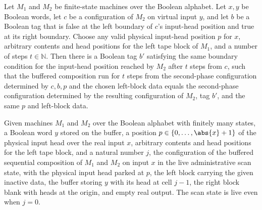 \begin{lemma}
\label{Turing.FinTM.bufferedSecondCfg_run}
\leanok
{}
Let $M_1$ and $M_2$ be finite-state machines over the Boolean alphabet. Let $x,y$ be
Boolean words, let $c$ be a configuration of $M_2$ on virtual input $y$, and let $b$ be
a Boolean tag that is false at the left boundary of $c$'s input-head position and true
at its right boundary. Choose any valid physical input-head position $p$ for $x$,
arbitrary contents and head positions for the left tape block of $M_1$, and a number of
steps $t\in\mathbb N$. Then there is a Boolean tag $b'$ satisfying the same boundary
condition for the input-head position reached by $M_2$ after $t$ steps from $c$, such
that the buffered composition run for $t$ steps from the second-phase configuration
determined by $c,b,p$ and the chosen left-block data equals the second-phase
configuration determined by the resulting configuration of $M_2$, tag $b'$, and the same
$p$ and left-block data.
\end{lemma}

\begin{definition}
\label{Turing.FinTM.bufferedScanCfg}
\leanok
{}
Given machines $M_1$ and $M_2$ over the Boolean alphabet with finitely many
states, a Boolean word $y$ stored on the buffer, a position
$p \in \{0,\dots,\abs{x}+1\}$ of the physical input head over the real input
$x$, arbitrary contents and head positions for the left tape block, and a
natural number $j$, the configuration of the buffered sequential composition
of $M_1$ and $M_2$ on input $x$ in the live administrative scan state, with
the physical input head parked at $p$, the left block carrying the given
inactive data, the buffer storing $y$ with its head at cell $j - 1$, the
right block blank with heads at the origin, and empty real output.  The scan
state is live even when $j = 0$.
\end{definition}

